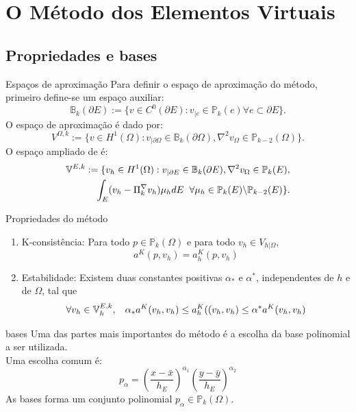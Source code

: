 \documentclass{beamer}
\begin{document}
\section{O Método dos Elementos Virtuais}

\subsection{Propriedades e bases}

\begin{frame}{Espaços de aproximação}
    Para definir o espaço de aproximação do método, primeiro define-se um espaço auxiliar: $$\mathbb{B}_k(\partial E) := \{ v \in C^0(\partial E) : v_{|e} \in \mathbb{P}_k(e) \forall e \subset \partial E \}.$$ \pause
    O espaço de aproximação é dado por: $$V^{\Omega,k}:=\{v \in H^1(\Omega): v_{|\partial\Omega} \in \mathbb{B}_k(\partial\Omega), \nabla^2 v_{\Omega} \in \mathbb{P}_{k-2}(\Omega)\}.$$ \pause 
    O espaço ampliado de \cite{equivalentprojectorsvirtualelementmethods2013a} é:$$\begin{aligned}
        \mathbb{V}^{E,k}:=\{v_h \in H^1(\Omega): v_{|\partial E} \in \mathbb{B}_k(\partial E), \nabla^2 v_{\Omega} \in \mathbb{P}_{k}(E), \\ \int_E (v_h - \Pi_k^\nabla v_h) \mu_h dE \hspace{2mm} \forall\mu_h \in \mathbb{P}_k(E)\backslash \mathbb{P}_{k-2}(E) \}.
    \end{aligned}$$
\end{frame}

\begin{frame}{Propriedades do método}
    \begin{enumerate}
        \item K-consistência: Para todo $p \in \mathbb{P}_k(\Omega)$ e para todo $v_h \in V_{h|\Omega}$,  $$a^K(p,v_h) = a_h^K(p,v_h)$$
        \item Estabilidade: Existem duas constantes positivas $\alpha_*$ e $\alpha^*$, independentes de $h$ e de $\Omega$, tal que $$\forall v_h \in \mathbb{V}^{E,k}_h, \hspace{3mm} \alpha_* a^K(v_h,v_h) \leq a_h^K((v_h,v_h) \leq \alpha^* a^K(v_h,v_h)$$
    \end{enumerate}    
\end{frame}

\begin{frame}{bases}
    Uma das partes mais importantes do método é a escolha da base polinomial a ser utilizada.\\
    Uma escolha comum é: $$p_{\alpha} = \left(\frac{x -\bar{x}}{h_E}\right)^{\alpha_1}\left(\frac{y -\bar{y}}{h_E}\right)^{\alpha_2}$$ \pause
    As bases forma um conjunto polinomial $p_\alpha \in \mathbb{P}_k(\Omega)$. 
\end{frame}
\end{document}

